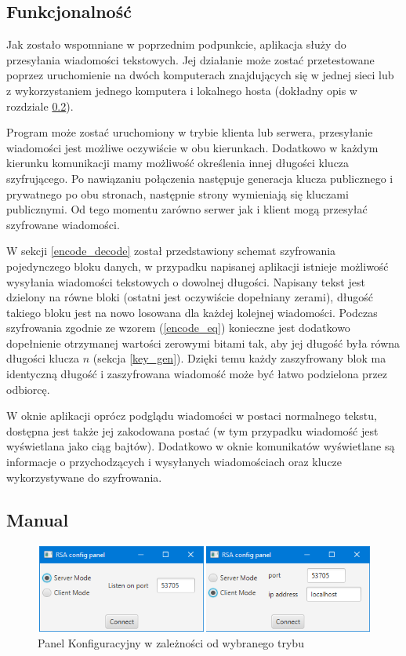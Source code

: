 \documentclass[10pt,a4paper]{article}
\begin{document}
\subsection{Funkcjonalność}

Jak zostało wspomniane w poprzednim podpunkcie, aplikacja służy do przesyłania wiadomości tekstowych. Jej działanie może zostać przetestowane poprzez uruchomienie na dwóch komputerach znajdujących się w jednej sieci lub z wykorzystaniem jednego komputera i lokalnego hosta (dokładny opis w rozdziale \ref{subsec:manual}). 

Program może zostać uruchomiony w trybie klienta lub serwera, przesyłanie wiadomości jest możliwe oczywiście w obu kierunkach. Dodatkowo w każdym kierunku komunikacji mamy możliwość określenia innej długości klucza szyfrującego. Po nawiązaniu połączenia następuje generacja klucza publicznego i prywatnego po obu stronach, następnie strony wymieniają się kluczami publicznymi. Od tego momentu zarówno serwer jak i klient mogą przesyłać szyfrowane wiadomości. 

W sekcji \ref{encode_decode} został przedstawiony schemat szyfrowania pojedynczego bloku danych, w przypadku napisanej aplikacji istnieje możliwość wysyłania wiadomości tekstowych o dowolnej długości. Napisany tekst jest dzielony na równe bloki (ostatni jest oczywiście dopełniany zerami), długość takiego bloku jest na nowo losowana dla każdej kolejnej wiadomości. Podczas szyfrowania zgodnie ze wzorem (\ref{encode_eq}) konieczne jest dodatkowo dopełnienie otrzymanej wartości zerowymi bitami tak, aby jej długość była równa długości klucza $n$ (sekcja \ref{key_gen}). Dzięki temu każdy zaszyfrowany blok ma identyczną długość i zaszyfrowana wiadomość może być łatwo podzielona przez odbiorcę.

W oknie aplikacji oprócz podglądu wiadomości w postaci normalnego tekstu, dostępna jest także jej zakodowana postać (w tym przypadku wiadomość jest wyświetlana jako ciąg bajtów). Dodatkowo w oknie komunikatów wyświetlane są informacje o przychodzących i wysyłanych wiadomościach oraz klucze wykorzystywane do szyfrowania. 

\subsection{Manual}
\label{subsec:manual}

\begin{figure}[!h]
	\centering
	\includegraphics[scale=0.85]{img/config_panel.png}
	\caption{Panel Konfiguracyjny w zależności od wybranego trybu}
	\label{fig:config_panel}
\end{figure}
\end{document}
